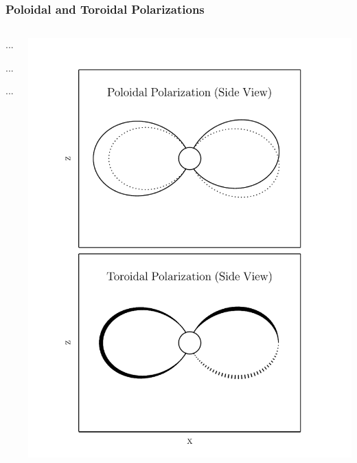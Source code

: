 \documentclass{beamer}
\begin{document}
\begin{frame}
\frametitle{Poloidal and Toroidal Polarizations}

\begin{columns}
\begin{wideitemize}
\item ...
\item ...
\item ...
\end{wideitemize}
\includegraphics[width=\textwidth]{figures/polarizations.pdf}
\end{columns}

\end{frame}

\end{document}
